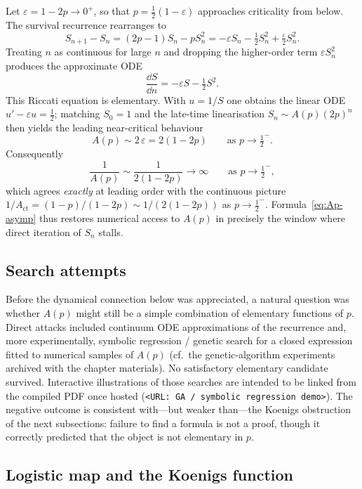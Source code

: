 Let $\varepsilon=1-2p\to 0^{+}$, so that $p=\tfrac12(1-\varepsilon)$ approaches criticality from below. The survival recurrence rearranges to
\[
S_{n+1}-S_n
=
(2p-1)S_n - p S_n^2
=
-\varepsilon S_n - \tfrac12 S_n^2 + \tfrac{\varepsilon}{2}S_n^2.
\]
Treating $n$ as continuous for large $n$ and dropping the higher-order term $\varepsilon S_n^2$ produces the approximate ODE
\begin{equation}
\label{eq:S-ode}
\frac{\dd S}{\dd n}
=
-\varepsilon S - \tfrac12 S^2.
\end{equation}
This Riccati equation is elementary. With $u=1/S$ one obtains the linear ODE $u'-\varepsilon u=\tfrac12$; matching $S_0=1$ and the late-time linearisation $S_n\sim A(p)(2p)^n$ then yields the leading near-critical behaviour
\begin{equation}
\label{eq:Ap-asymp}
A(p)
\sim
2\,\varepsilon
=
2(1-2p)
\qquad\text{as }p\to\tfrac12^{-}.
\end{equation}
Consequently
\[
\frac{1}{A(p)}
\sim
\frac{1}{2(1-2p)}
\to\infty
\qquad\text{as }p\to\tfrac12^{-},
\]
which agrees \emph{exactly} at leading order with the continuous picture $1/A_{\mathrm{ct}}=(1-p)/(1-2p)\sim 1/(2(1-2p))$ as $p\to\tfrac12^{-}$. Formula~\eqref{eq:Ap-asymp} thus restores numerical access to $A(p)$ in precisely the window where direct iteration of $S_n$ stalls.

\subsection{Search attempts}
\label{sec:ap-search}

Before the dynamical connection below was appreciated, a natural question was whether $A(p)$ might still be a simple combination of elementary functions of $p$. Direct attacks included continuum ODE approximations of the recurrence and, more experimentally, symbolic regression / genetic search for a closed expression fitted to numerical samples of $A(p)$ (cf.\ the genetic-algorithm experiments archived with the chapter materials). No satisfactory elementary candidate survived. Interactive illustrations of those searches are intended to be linked from the compiled PDF once hosted
(\texttt{<URL: GA / symbolic regression demo>}).
The negative outcome is consistent with---but weaker than---the Koenigs obstruction of the next subsections: failure to find a formula is not a proof, though it correctly predicted that the object is not elementary in $p$.

\subsection{Logistic map and the Koenigs function}
\label{sec:koenigs-intro}

